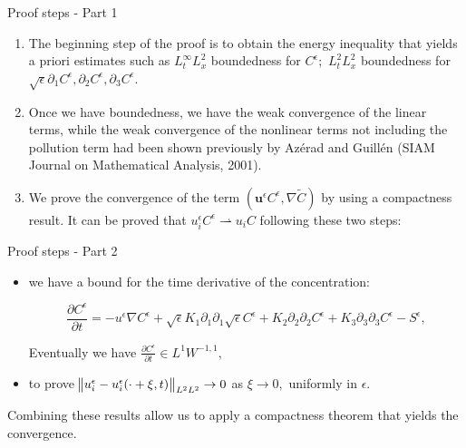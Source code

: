 \documentclass{beamer}
\begin{document}
\begin{frame}{Proof steps - Part 1}
  \begin{enumerate}
    \item The beginning step of the proof is to obtain the energy inequality that yields a priori estimates such as $L_t^\infty L_x^2$ boundedness for $C^\epsilon;$ $L_t^2 L_x^2$ boundedness for $\sqrt{\epsilon} \partial_1 C^\epsilon, \partial_2 C^\epsilon, \partial_3 C^\epsilon.$
  
    \item Once we have boundedness, we have the weak convergence of the linear terms, while the weak convergence of the nonlinear terms not including the pollution term had been shown previously by Az\'erad and Guill\'en (SIAM Journal on Mathematical Analysis, 2001).
    
    \item We prove the convergence of the term $(\mathbf{u}^\epsilon C^\epsilon, \nabla \tilde{C})$ by using a compactness result. It can be proved that $u_i^\epsilon C^\epsilon \rightharpoonup  u_i C$ following these two steps:
  \end{enumerate}
\end{frame}

\begin{frame}{Proof steps - Part 2}

    \begin{itemize}
    
      \item we have a bound for the time derivative of the concentration:
      
      \[  \frac{\partial C^\epsilon}{\partial t} = - u^\epsilon \nabla C^\epsilon + \sqrt{\epsilon} K_1 \partial_1 \partial_1 \sqrt{\epsilon} C^\epsilon + K_2 \partial_2 \partial_2 C^\epsilon + K_3 \partial_3 \partial_3 C^\epsilon -S^\epsilon, \]
      
      Eventually we have $\frac{\partial C^\epsilon}{\partial t} \in L^1 W^{-1,1},$
      
      \item to prove $\norm{u_i^\epsilon - u_i^\epsilon (\cdot + \xi,t)}_{L^2 L^2} \to 0$ as $\xi \to 0,$ uniformly in $\epsilon.$
    
    \end{itemize}
    
    Combining these results allow us to apply a compactness theorem that yields the convergence.
    
\end{frame}
\end{document}
